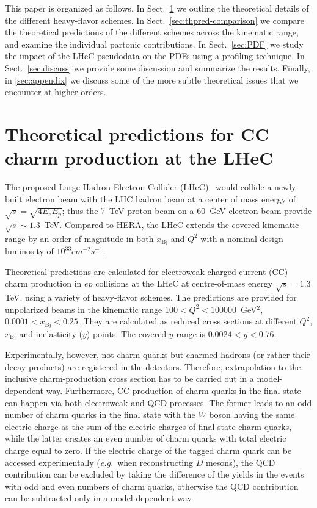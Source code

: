 \documentclass[pdftex,twocolumn,epjc3]{svjour3}          %
\newcommand{\xbj}{\ensuremath{x_{\text{Bj}}}\xspace}
\begin{document}
This paper is organized as follows.
%
In Sect.~\ref{sec:thpred} we outline the theoretical details of the
different heavy-flavor schemes.
%
In Sect.~\ref{sec:thpred-comparison} we compare the theoretical
predictions of the different schemes across the kinematic range, and
examine the individual partonic contributions.
%
In Sect.~\ref{sec:PDF} we study the impact of the LHeC pseudodata on
the PDFs using a profiling technique.
%
In Sect.~\ref{sec:discuss} we provide some discussion and summarize the
results.
%
Finally, in \ref{sec:appendix} we discuss some of the more subtle
theoretical issues that we encounter at higher orders.

\section{Theoretical predictions for CC charm production at the LHeC} \label{sec:thpred}

The proposed Large Hadron Electron Collider
(LHeC)~\cite{AbelleiraFernandez:2012cc} would collide a newly built
electron beam with the LHC hadron beam at a center of mass energy of
$\sqrt{s} = \sqrt{4 E_e E_p}$; thus the 7~TeV proton beam on a 60~GeV
electron beam provide $\sqrt{s}\sim 1.3$~TeV.
%
Compared to HERA, the LHeC extends the covered kinematic range by an
order of magnitude in both \xbj and $Q^2$ with a nominal design
luminosity of $10^{33} cm^{-2} s^{-1}$.


Theoretical predictions are calculated for electroweak charged-current
(CC) charm production in $ep$ collisions at the LHeC at centre-of-mass
energy $\sqrt{s} = 1.3$ TeV, using a variety of heavy-flavor
schemes. The predictions are provided for unpolarized beams in the
kinematic range $100 < Q^2 < 100000$~GeV$^2$, $0.0001 < \xbj < 0.25$.
They are calculated as reduced cross sections at different $Q^2$, \xbj
and inelasticity ($y$) points. 
The covered $y$ range is $0.0024 < y < 0.76$.

Experimentally, however, not charm quarks but charmed hadrons (or
rather their decay products) are registered in the detectors.
Therefore, extrapolation to the inclusive charm-production cross
section has to be carried out in a model-dependent way. Furthermore,
CC production of charm quarks in the final state can happen via both
electroweak and QCD processes.  The former leads to an odd number of
charm quarks in the final state with the $W$ boson having the same
electric charge as the sum of the electric charges of final-state
charm quarks, while the latter creates an even number of charm quarks
with total electric charge equal to zero. If the electric charge of
the tagged charm quark can be accessed experimentally
(\textit{e.g.}~when reconstructing $D$ mesons), the QCD contribution
can be excluded by taking the difference of the yields in the events
with odd and even numbers of charm quarks, otherwise the QCD
contribution can be subtracted only in a model-dependent way.
\end{document}
